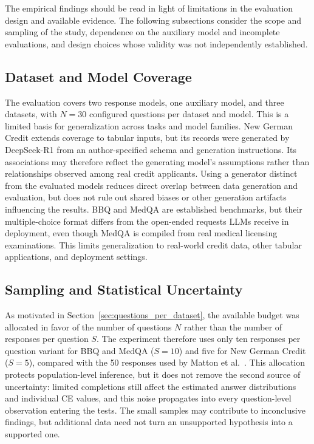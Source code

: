 The empirical findings should be read in light of limitations in the evaluation design and available evidence. The following subsections consider the scope and sampling of the study, dependence on the auxiliary model and incomplete evaluations, and design choices whose validity was not independently established.

\subsection{Dataset and Model Coverage}

The evaluation covers two response models, one auxiliary model, and three datasets, with $N=30$ configured questions per dataset and model. This is a limited basis for generalization across tasks and model families. New German Credit extends coverage to tabular inputs, but its records were generated by DeepSeek-R1 from an author-specified schema and generation instructions. Its associations may therefore reflect the generating model's assumptions rather than relationships observed among real credit applicants. Using a generator distinct from the evaluated models reduces direct overlap between data generation and evaluation, but does not rule out shared biases or other generation artifacts influencing the results. BBQ and MedQA are established benchmarks, but their multiple-choice format differs from the open-ended requests LLMs receive in deployment, even though MedQA is compiled from real medical licensing examinations. This limits generalization to real-world credit data, other tabular applications, and deployment settings.

\subsection{Sampling and Statistical Uncertainty}

As motivated in Section~\ref{sec:questions_per_dataset}, the available budget was allocated in favor of the number of questions $N$ rather than the number of responses per question $S$. The experiment therefore uses only ten responses per question variant for BBQ and MedQA ($S = 10$) and five for New German Credit ($S = 5$), compared with the 50 responses used by Matton et al.~\cite{mattonWalkTalkMeasuring2024}. This allocation protects population-level inference, but it does not remove the second source of uncertainty: limited completions still affect the estimated answer distributions and individual CE values, and this noise propagates into every question-level observation entering the tests. The small samples may contribute to inconclusive findings, but additional data need not turn an unsupported hypothesis into a supported one.

